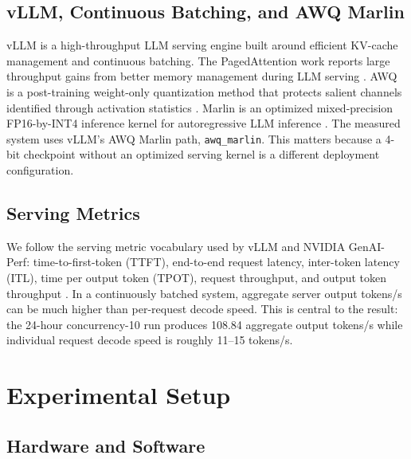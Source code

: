 \documentclass[11pt]{article}
\begin{document}
\subsection{vLLM, Continuous Batching, and AWQ Marlin}

vLLM is a high-throughput LLM serving engine built around efficient KV-cache
management and continuous batching. The PagedAttention work reports large
throughput gains from better memory management during LLM serving
\cite{vllm_pagedattention}. AWQ is a post-training weight-only quantization
method that protects salient channels identified through activation statistics
\cite{awq}. Marlin is an optimized mixed-precision FP16-by-INT4 inference kernel
for autoregressive LLM inference \cite{marlin}. The measured system uses vLLM's
AWQ Marlin path, \texttt{awq\_marlin}. This matters because a 4-bit checkpoint
without an optimized serving kernel is a different deployment configuration.

\subsection{Serving Metrics}

We follow the serving metric vocabulary used by vLLM and NVIDIA GenAI-Perf:
time-to-first-token (TTFT), end-to-end request latency, inter-token latency
(ITL), time per output token (TPOT), request throughput, and output token
throughput \cite{vllm_bench_serve,genai_perf_docs}. In a continuously batched
system, aggregate server output tokens/s can be much higher than per-request
decode speed. This is central to the result: the 24-hour concurrency-10 run
produces 108.84 aggregate output tokens/s while individual request decode speed
is roughly 11--15 tokens/s.

\section{Experimental Setup}

\subsection{Hardware and Software}
\end{document}
